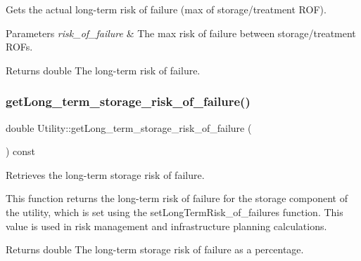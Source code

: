 Gets the actual long-\/term risk of failure (max of storage/treatment R\+OF). 


\begin{DoxyParams}{Parameters}
{\em risk\+\_\+of\+\_\+failure} & The max risk of failure between storage/treatment R\+O\+Fs.\\
\hline
\end{DoxyParams}
\begin{DoxyReturn}{Returns}
double The long-\/term risk of failure. 
\end{DoxyReturn}
\mbox{\label{classUtility_a3c35a6860d65f40648238b2719377bf6}} 
\subsubsection{\texorpdfstring{get\+Long\+\_\+term\+\_\+storage\+\_\+risk\+\_\+of\+\_\+failure()}{getLong\_term\_storage\_risk\_of\_failure()}}
{\footnotesize\ttfamily double Utility\+::get\+Long\+\_\+term\+\_\+storage\+\_\+risk\+\_\+of\+\_\+failure (\begin{DoxyParamCaption}{ }\end{DoxyParamCaption}) const}



Retrieves the long-\/term storage risk of failure. 

This function returns the long-\/term risk of failure for the storage component of the utility, which is set using the set\+Long\+Term\+Risk\+\_\+of\+\_\+failures function. This value is used in risk management and infrastructure planning calculations.

\begin{DoxyReturn}{Returns}
double The long-\/term storage risk of failure as a percentage. 
\end{DoxyReturn}
\mbox{\label{classUtility_aade5d5dc1ea04641ef9f709542848316}} 
